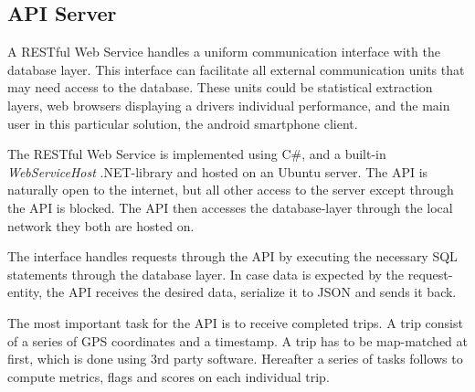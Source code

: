 \subsection{API Server}\label{subsec:api}
A RESTful Web Service handles a uniform communication interface with the database layer. This interface can facilitate all external communication units that may need access to the database. These units could be statistical extraction layers, web browsers displaying a drivers individual performance, and the main user in this particular solution, the android smartphone client. 

The RESTful Web Service is implemented using C\#, and a built-in \textit{WebServiceHost} .NET-library and hosted on an Ubuntu server. The API is naturally open to the internet, but all other access to the server except through the API is blocked. The API then accesses the database-layer through the local network they both are hosted on.

The interface handles requests through the API by executing the necessary SQL statements through the database layer. In case data is expected by the request-entity, the API receives the desired data, serialize it to JSON and sends it back.

The most important task for the API is to receive completed trips. A trip consist of a series of GPS coordinates and a timestamp. A trip has to be map-matched at first, which is done using 3rd party software\cite{trackmatch}. Hereafter a series of tasks follows to compute metrics, flags and scores on each individual trip\cite{sw9_report}. 

